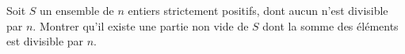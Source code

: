 Soit $S$ un ensemble de $n$ entiers strictement positifs, dont aucun n'est divisible par $n$. Montrer qu'il existe une partie non vide de $S$ dont la somme des éléments est divisible par $n$.
